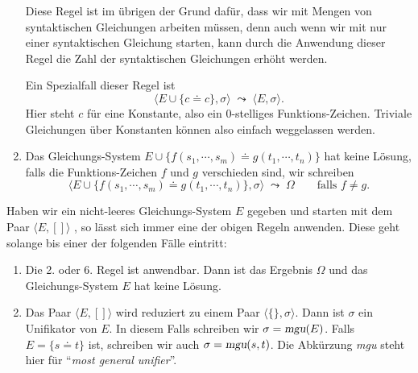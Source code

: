 \begin{enumerate}
      Diese Regel ist im \"{u}brigen der Grund daf\"{u}r, dass wir mit Mengen von syntaktischen Gleichungen
      arbeiten m\"{u}ssen, denn auch wenn wir mit nur einer syntaktischen Gleichung starten, kann 
      durch die Anwendung dieser Regel die Zahl der syntaktischen Gleichungen erh\"{o}ht werden.

      Ein Spezialfall dieser Regel ist 
      \[ \Big\langle E \cup \big\{ c \doteq c \big\}, \sigma \Big\rangle \;\leadsto\; 
         \Big\langle E, \sigma \Big\rangle.
      \]
      Hier steht $c$ f\"{u}r eine Konstante, also ein 0-stelliges Funktions-Zeichen. 
      Triviale Gleichungen \"{u}ber Konstanten k\"{o}nnen also einfach weggelassen werden.
\item Das Gleichungs-System $E \cup \big\{ f(s_1,\cdots,s_m) \doteq g(t_1,\cdots,t_n) \big\}$
      hat keine L\"{o}sung, falls die Funk\-tions-Zeichen $f$ und $g$ verschieden sind, wir schreiben
      \[ \Big\langle E \cup \big\{ f(s_1,\cdots,s_m) \doteq g(t_1,\cdots,t_n) \big\},
      \sigma \Big\rangle \;\leadsto\; \Omega \qquad \mbox{falls $f \not= g$}. \]
\end{enumerate}
Haben wir ein nicht-leeres Gleichungs-System $E$ gegeben und starten mit dem Paar 
$\langle E, []\rangle$  , so l\"{a}sst sich immer eine der
obigen Regeln anwenden.  Diese geht solange bis einer der folgenden F\"{a}lle eintritt:
\begin{enumerate}
\item Die 2. oder 6. Regel ist anwendbar.  Dann ist das Ergebnis $\Omega$ und das Gleichungs-System 
      $E$ hat keine L\"{o}sung.
\item Das Paar $\langle E, [] \rangle$ wird reduziert zu einem Paar $\langle \{\}, \sigma\rangle$.
      Dann ist $\sigma$ ein Unifikator von $E$.  In diesem Falls schreiben wir $\sigma = \textsl{mgu}(E)$.
      Falls $E = \{ s \doteq t \}$ ist, schreiben wir auch $\sigma = \textsl{mgu}(s, t)$.  Die Abk\"{u}rzung
      \textsl{mgu} steht hier f\"{u}r ``\emph{most general unifier}''.
\end{enumerate}

